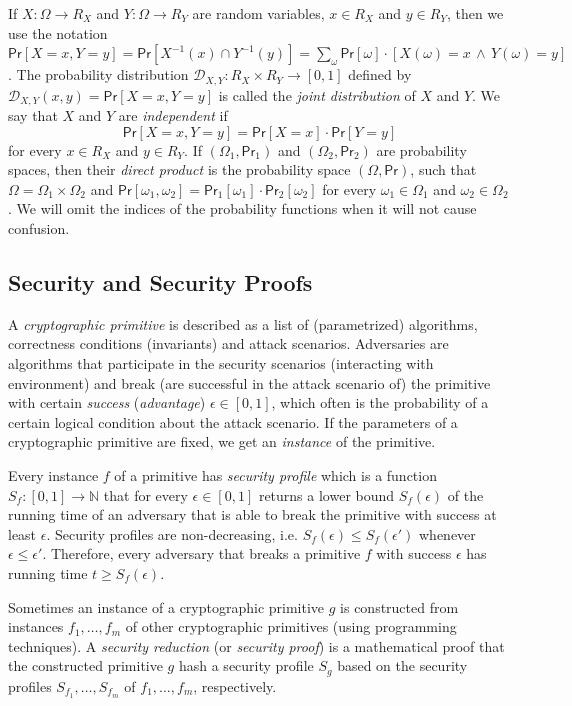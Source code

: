 \documentclass{article}
\newcommand{\prob}[0]{\mathsf{Pr}} %
\begin{document}
If $X\colon \Omega\rightarrow R_X$ and $Y\colon \Omega\rightarrow R_Y$ are
random variables, $x\in R_X$ and $y\in R_Y$, then we use the notation
$\prob[X=x, Y=y] = \prob[X^{-1}(x)\cap Y^{-1}(y)]=\sum_\omega \prob[\omega]\cdot[X(\omega)=x\,\wedge\, Y(\omega)=y]$.
The probability distribution $\mathcal{D}_{X,Y}\colon R_X \times R_Y\rightarrow [0,1]$ defined by $\mathcal{D}_{X,Y}(x,y)= \prob[X=x, Y=y]$ is called the \emph{joint distribution} of $X$ and $Y$.
We say that $X$ and $Y$ are \emph{independent} if
\[
\prob[X=x,Y=y]=\prob[X=x]\cdot\prob[Y=y]
\]
for every $x\in R_X$ and $y\in R_Y$.
If $(\Omega_1,\prob_1)$ and $(\Omega_2,\prob_2)$ are probability spaces, then their \emph{direct product} is the probability space $(\Omega, \prob)$, such that $\Omega = \Omega_1 \times \Omega_2$ and $\prob[\omega_1,\omega_2]=\prob_1[\omega_1]\cdot \prob_2[\omega_2]$ for every $\omega_1\in\Omega_1$ and $\omega_2\in\Omega_2$. We will omit the indices of the probability functions when it will not cause confusion.

\subsection{Security and Security Proofs}

A \emph{cryptographic primitive} is described as a list of (parametrized) algorithms, correctness conditions (invariants) and attack scenarios. Adversaries are algorithms that participate in the security scenarios (interacting with environment) and break (are successful in the attack scenario of) the primitive with certain \emph{success} (\emph{advantage}) $\epsilon\in[0,1]$, which often is the probability of a certain logical condition about the attack scenario.
If the parameters of a cryptographic primitive are fixed, we get an \emph{instance} of the primitive.

Every instance $f$ of a primitive has \emph{security profile}
which is a function $S_f\colon [0,1]\rightarrow \mathbb{N}$ that for every $\epsilon\in [0,1]$ returns a lower bound $S_f(\epsilon)$ of the running time of an adversary that is able to break the primitive with success at least $\epsilon$. Security profiles are non-decreasing, i.e.
$S_f(\epsilon)\le S_f(\epsilon')$ whenever $\epsilon\le \epsilon'$.
Therefore, every adversary that breaks a primitive $f$ with success $\epsilon$ has running time $t\ge S_f(\epsilon)$.

Sometimes an instance of a cryptographic primitive $g$ is constructed from instances $f_1, \ldots, f_m$ of other cryptographic primitives (using programming techniques).
A \emph{security reduction} (or \emph{security proof}) is a mathematical proof that the constructed primitive $g$ hash a security profile $S_g$
based on the security profiles $S_{f_1}, \ldots, S_{f_m}$ of $f_1, \ldots, f_m$, respectively.
\end{document}

